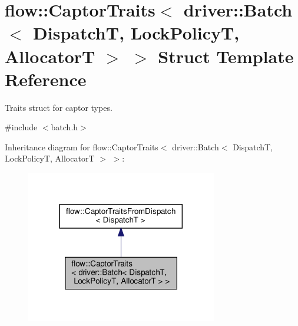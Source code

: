 \hypertarget{structflow_1_1_captor_traits_3_01driver_1_1_batch_3_01_dispatch_t_00_01_lock_policy_t_00_01_allocator_t_01_4_01_4}{}\section{flow\+:\+:Captor\+Traits$<$ driver\+:\+:Batch$<$ DispatchT, Lock\+PolicyT, AllocatorT $>$ $>$ Struct Template Reference}
\label{structflow_1_1_captor_traits_3_01driver_1_1_batch_3_01_dispatch_t_00_01_lock_policy_t_00_01_allocator_t_01_4_01_4}


Traits struct for captor types.  




{\ttfamily \#include $<$batch.\+h$>$}



Inheritance diagram for flow\+:\+:Captor\+Traits$<$ driver\+:\+:Batch$<$ DispatchT, Lock\+PolicyT, AllocatorT $>$ $>$\+:\nopagebreak
\begin{figure}[H]
\begin{center}
\leavevmode
\includegraphics[width=236pt]{structflow_1_1_captor_traits_3_01driver_1_1_batch_3_01_dispatch_t_00_01_lock_policy_t_00_01_allo751714d7b227bc6ebcbd68d7c4ff28b6}
\end{center}
\end{figure}


